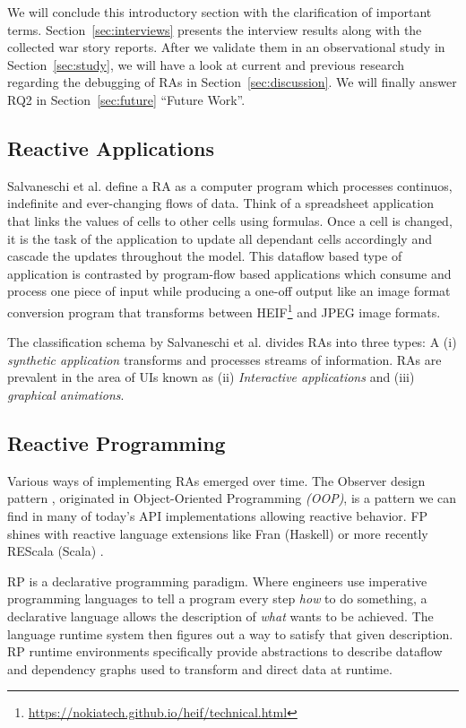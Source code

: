 \documentclass[12pt,a4paper]{article}
\begin{document}
We will conclude this introductory section with the clarification of important terms. Section~\ref{sec:interviews} presents the interview results along with the collected war story reports. After we validate them in an observational study in Section~\ref{sec:study}, we will have a look at current and previous research regarding the debugging of RAs in Section~\ref{sec:discussion}. We will finally answer RQ2 in Section~\ref{sec:future} ``Future Work''.

\subsection{Reactive Applications}

Salvaneschi et al. \cite{7827078} define a RA as a computer program which processes continuos, indefinite and ever-changing flows of data. Think of a spreadsheet application\cite{10.1145/2501654.2501666} that links the values of cells to other cells using formulas. Once a cell is changed, it is the task of the application to update all dependant cells accordingly and cascade the updates throughout the model. This dataflow based type of application is contrasted by program-flow based applications which consume and process one piece of input while producing a one-off output like an image format conversion program that transforms between HEIF\footnote{\url{https://nokiatech.github.io/heif/technical.html}} and JPEG image formats.

The classification schema by Salvaneschi et al. \cite{7827078} divides RAs into three types: A (i) \emph{synthetic application} transforms and processes streams of information. RAs are prevalent in the area of UIs known as (ii) \emph{Interactive applications} and (iii) \emph{graphical animations}.

\subsection{Reactive Programming}

Various ways of implementing RAs emerged over time. The Observer design pattern \cite{gamma1995design}, originated in Object-Oriented Programming \emph{(OOP)}, is a pattern we can find in many of today's API implementations\cite{alabor:2019:reactiveappllications} allowing reactive behavior. FP shines with reactive language extensions like Fran (Haskell) \cite{10.1145/2501654.2501666} or more recently REScala (Scala) \cite{10.1145/2577080.2577083}.

RP is a declarative programming paradigm. Where engineers use imperative programming languages to tell a program every step \emph{how} to do something, a declarative language allows the description of \emph{what} wants to be achieved. The language runtime system then figures out a way to satisfy that given description. RP runtime environments specifically provide abstractions to describe dataflow and dependency graphs used to transform and direct data at runtime.
\end{document}
